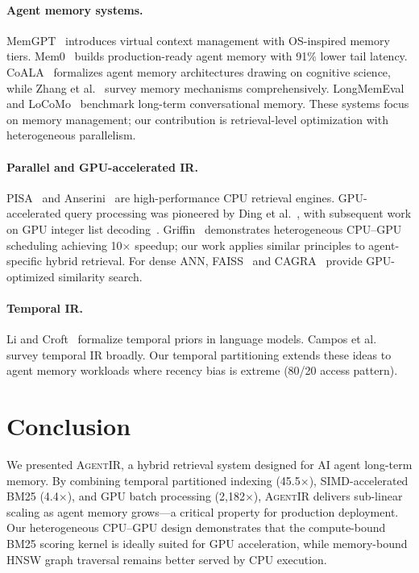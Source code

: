 \documentclass[sigconf,nonacm,anonymous]{acmart}
\newcommand{\sysname}{\textsc{AgentIR}}
\newcommand{\speedup}[1]{#1$\times$}
\begin{document}
\paragraph{Agent memory systems.}
MemGPT~\cite{packer2024memgpt} introduces virtual context management
with OS-inspired memory tiers.  Mem0~\cite{chhikara2025mem0}
builds production-ready agent memory with 91\% lower tail latency.
CoALA~\cite{sumers2024coala} formalizes agent memory architectures
drawing on cognitive science, while Zhang et al.~\cite{zhang2024memory_survey}
survey memory mechanisms comprehensively.
LongMemEval~\cite{wu2025longmemeval} and
LoCoMo~\cite{maharana2024locomo} benchmark long-term conversational
memory.  These systems focus on memory management; our contribution
is retrieval-level optimization with heterogeneous parallelism.

\paragraph{Parallel and GPU-accelerated IR.}
PISA~\cite{mallia2019pisa} and Anserini~\cite{yang2017anserini}
are high-performance CPU retrieval engines.
GPU-accelerated query processing was pioneered by
Ding et al.~\cite{ding2009gpu_ir}, with subsequent work on
GPU integer list decoding~\cite{mallia2019gpu_decoding}.
Griffin~\cite{liu2018griffin} demonstrates heterogeneous CPU--GPU
scheduling achieving 10$\times$ speedup; our work applies similar
principles to agent-specific hybrid retrieval.
For dense ANN, FAISS~\cite{johnson2021faiss} and
CAGRA~\cite{ootomo2024cagra} provide GPU-optimized similarity search.

\paragraph{Temporal IR.}
Li and Croft~\cite{li2003temporal} formalize temporal priors in
language models.  Campos et al.~\cite{campos2014temporal_survey}
survey temporal IR broadly.  Our temporal partitioning extends these
ideas to agent memory workloads where recency bias is extreme
(80/20 access pattern).

\section{Conclusion}
\label{sec:conclusion}

We presented \sysname{}, a hybrid retrieval system designed for
AI agent long-term memory.  By combining temporal partitioned
indexing (\speedup{45.5}), SIMD-accelerated BM25 (\speedup{4.4}),
and GPU batch processing (\speedup{2,182}), \sysname{} delivers
sub-linear scaling as agent memory grows---a critical property
for production deployment.  Our heterogeneous CPU--GPU design
demonstrates that the compute-bound BM25 scoring kernel is
ideally suited for GPU acceleration, while memory-bound HNSW
graph traversal remains better served by CPU execution.



\end{document}

